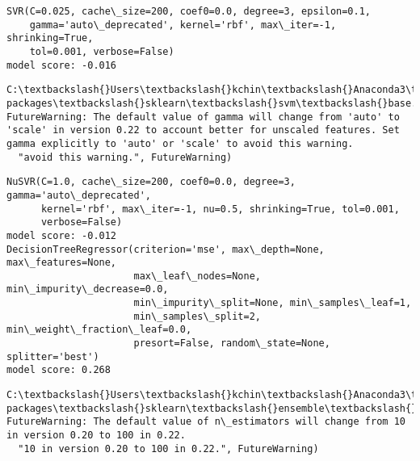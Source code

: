 \documentclass[11pt]{article}
\begin{document}
    \begin{Verbatim}[commandchars=\\\{\}]
SVR(C=0.025, cache\_size=200, coef0=0.0, degree=3, epsilon=0.1,
    gamma='auto\_deprecated', kernel='rbf', max\_iter=-1, shrinking=True,
    tol=0.001, verbose=False)
model score: -0.016

    \end{Verbatim}

    \begin{Verbatim}[commandchars=\\\{\}]
C:\textbackslash{}Users\textbackslash{}kchin\textbackslash{}Anaconda3\textbackslash{}lib\textbackslash{}site-packages\textbackslash{}sklearn\textbackslash{}svm\textbackslash{}base.py:193: FutureWarning: The default value of gamma will change from 'auto' to 'scale' in version 0.22 to account better for unscaled features. Set gamma explicitly to 'auto' or 'scale' to avoid this warning.
  "avoid this warning.", FutureWarning)

    \end{Verbatim}

    \begin{Verbatim}[commandchars=\\\{\}]
NuSVR(C=1.0, cache\_size=200, coef0=0.0, degree=3, gamma='auto\_deprecated',
      kernel='rbf', max\_iter=-1, nu=0.5, shrinking=True, tol=0.001,
      verbose=False)
model score: -0.012
DecisionTreeRegressor(criterion='mse', max\_depth=None, max\_features=None,
                      max\_leaf\_nodes=None, min\_impurity\_decrease=0.0,
                      min\_impurity\_split=None, min\_samples\_leaf=1,
                      min\_samples\_split=2, min\_weight\_fraction\_leaf=0.0,
                      presort=False, random\_state=None, splitter='best')
model score: 0.268

    \end{Verbatim}

    \begin{Verbatim}[commandchars=\\\{\}]
C:\textbackslash{}Users\textbackslash{}kchin\textbackslash{}Anaconda3\textbackslash{}lib\textbackslash{}site-packages\textbackslash{}sklearn\textbackslash{}ensemble\textbackslash{}forest.py:245: FutureWarning: The default value of n\_estimators will change from 10 in version 0.20 to 100 in 0.22.
  "10 in version 0.20 to 100 in 0.22.", FutureWarning)

    \end{Verbatim}
\end{document}
